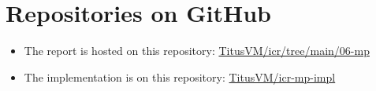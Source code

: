 \documentclass{article}
\begin{document}
\captionsetup{justification=centering}



\tableofcontents
\lstlistoflistings
\listoffigures

\section*{Repositories on GitHub}
\begin{itemize}
  \item The report is hosted on this repository: \href{https://github.com/TitusVM/icr/tree/main/06-mp}{TitusVM/icr/tree/main/06-mp}
  \item The implementation is on this repository: \href{https://github.com/TitusVM/icr-mp-impl}{TitusVM/icr-mp-impl}
\end{itemize}










\end{document}
